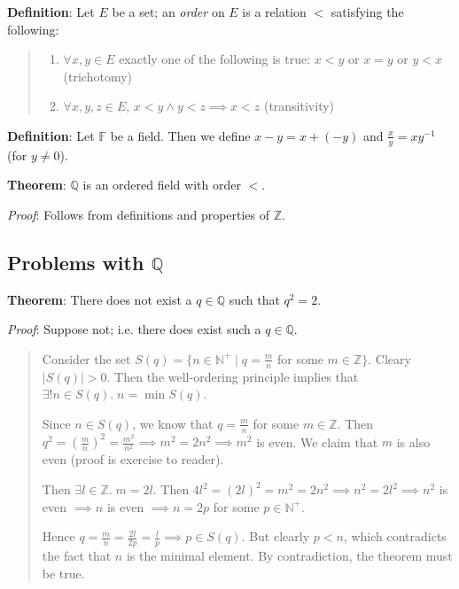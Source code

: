 \documentclass[11pt]{article}
\begin{document}
\textbf{Definition}: Let $E$ be a set; an \emph{order} on $E$ is a relation $<$ satisfying the following:
\begin{quote}\vspace{-0.3cm}
	\begin{enumerate}
	\item $\forall x,y \in E$ exactly one of the following is true: $x < y$ or $x = y$ or $y < x$ (trichotomy)
	\item $\forall x,y,z \in E$, $x < y \land y < z \implies x < z$ (transitivity)
	\end{enumerate}
\end{quote}

\textbf{Definition}: Let $\mathbb{F}$ be a field. Then we define $x - y = x + (-y)$ and $\frac{x}{y} = xy^{-1}$ (for $y \neq 0$).

\textbf{Theorem}: $\mathbb{Q}$ is an ordered field with order $<$.

\emph{Proof}: Follows from definitions and properties of $\mathbb{Z}$.


\subsection{Problems with $\mathbb{Q}$}

\textbf{Theorem}: There does not exist a $q \in \mathbb{Q}$ such that $q^2 = 2$.

\emph{Proof}: Suppose not; i.e. there does exist such a $q \in \mathbb{Q}$.
\begin{quote}\vspace{-0.3cm}
Consider the set $S(q) = \{n \in \mathbb{N}^+ \mid q = \frac{m}{n}$ for some $m \in \mathbb{Z}\}$. Cleary $|S(q)| > 0$. Then the well-ordering principle implies that $\exists !n \in S(q).\; n = \min S(q)$.

Since $n \in S(q)$, we know that $q = \frac{m}{n}$ for some $m \in \mathbb{Z}$. Then $q^2 = (\frac{m}{n})^2 = \frac{m^2}{n^2} \implies m^2 = 2n^2 \implies m^2$ is even. We claim that $m$ is also even (proof is exercise to reader).

Then $\exists l \in \mathbb{Z}.\; m = 2l$. Then $4l^2 = (2l)^2 = m^2 = 2n^2 \implies n^2 = 2l^2 \implies n^2$ is even $\implies n$ is even $\implies n = 2p$ for some $p \in \mathbb{N}^+$.

Hence $q = \frac{m}{n} = \frac{2l}{2p} = \frac{l}{p} \implies p \in S(q)$. But clearly $p < n$, which contradicts the fact that $n$ is the minimal element. By contradiction, the theorem must be true.
\end{quote}
\end{document}

